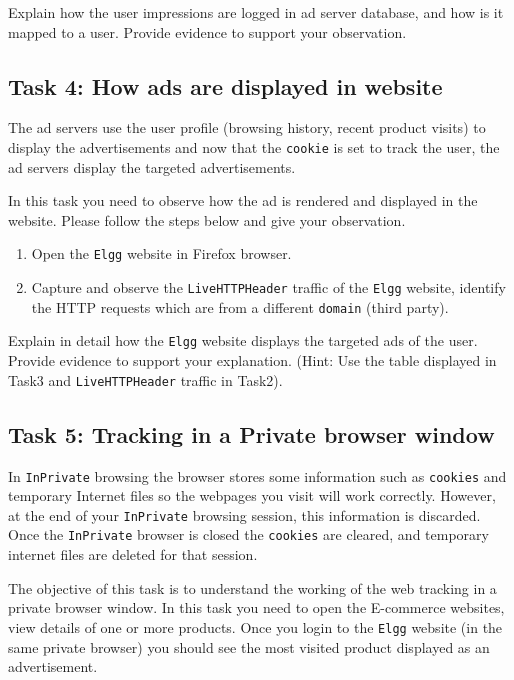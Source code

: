 Explain how the user impressions are logged in ad server database, and how is it mapped to a user. 
Provide evidence to support your observation.

\subsection{Task 4: How ads are displayed in website}

The ad servers use the user profile (browsing history, recent product visits) to display the advertisements and now that the {\tt cookie} is set to track the user, 
the ad servers display the targeted advertisements. 

In this task you need to observe how the ad is rendered and displayed in the website. 
Please follow the steps below and give your observation.
\begin{enumerate}
  \item Open the {\tt Elgg} website in Firefox browser.
  \item Capture and observe the {\tt LiveHTTPHeader} traffic of the {\tt Elgg} website, identify the HTTP requests which are from a different {\tt domain} (third party).
\end{enumerate}

Explain in detail how the {\tt Elgg} website displays the targeted ads of the user. 
Provide evidence to support your explanation. 
(Hint: Use the table displayed in Task3 and {\tt LiveHTTPHeader} traffic in Task2).

\subsection{Task 5: Tracking in a Private browser window}


In {\tt InPrivate} browsing the browser stores some information such as {\tt cookies} and temporary Internet files so the webpages you visit will work correctly. 
However, at the end of your {\tt InPrivate} browsing session, this information is discarded. 
Once the {\tt InPrivate} browser is closed the {\tt cookies} are cleared, and temporary internet files are deleted for that session.

The objective of this task is to understand the working of the web tracking in a private browser window. 
In this task you need to open the E-commerce websites, view details of one or more products. 
Once you login to the {\tt Elgg} website (in the same private browser) you should see the most visited product displayed as an advertisement.

